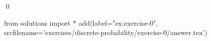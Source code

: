 
\begin{ex} 
  \label{ex:exercise-0}
  
  \qed
\end{ex} 
\begin{python0}
from solutions import *
add(label="ex:exercise-0",
    srcfilename='exercises/discrete-probability/exercise-0/answer.tex') 
\end{python0}
